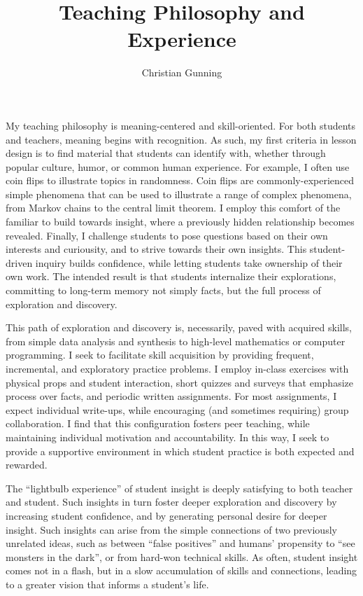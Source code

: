 \documentclass[12pt]{article}
\author{Christian Gunning}
\title{Teaching Philosophy and Experience}
\begin{document}
\maketitle
\thispagestyle{empty}
\linespread{1.25}\selectfont

My teaching philosophy is meaning-centered and skill-oriented.
For both students and teachers, meaning begins with recognition.
As such, my first criteria in lesson design
is to find material that students can identify with,
whether through popular culture, humor, or common human experience. 
For example, I often use coin flips to illustrate topics in 
randomness. Coin flips are commonly-experienced simple phenomena
that can be used to illustrate a range of complex phenomena,  
from Markov chains to the central limit theorem.
I employ this comfort of the familiar to build towards insight,
where a previously hidden relationship becomes revealed.
Finally, I challenge students to pose questions based on
their own interests and curiousity, and to strive towards 
their own insights. This student-driven inquiry builds confidence, 
while letting students take ownership of their own work.
The intended result is that students internalize their explorations,
committing to long-term memory not simply facts, but the full
process of exploration and discovery.

This path of exploration and discovery is, necessarily, paved 
with acquired skills, from simple data analysis and synthesis to 
high-level mathematics or computer programming. I seek to facilitate 
skill acquisition by providing frequent, incremental, and exploratory
practice problems. I employ in-class exercises with physical props 
and student interaction, short quizzes and surveys that emphasize 
process over facts, and periodic written assignments.  For most assignments,
I expect individual write-ups, while encouraging (and sometimes requiring) group
collaboration. I find that this configuration fosters peer teaching, while maintaining 
individual motivation and accountability. 
In this way, I seek to provide a supportive environment in which student practice 
is both expected and rewarded. 

The ``lightbulb experience'' of student insight is 
deeply satisfying to both teacher and student. Such insights in turn 
foster deeper exploration and discovery by increasing student confidence, 
and by generating personal desire for deeper insight.
 Such insights can arise from the simple connections of two previously 
unrelated ideas, such as between ``false positives'' 
and humans' propensity to ``see monsters in the dark'',
or from hard-won technical skills. As often, student insight comes not 
in a flash, but in a slow accumulation of skills and connections, 
leading to a greater vision that informs a student's life.  
\end{document}
